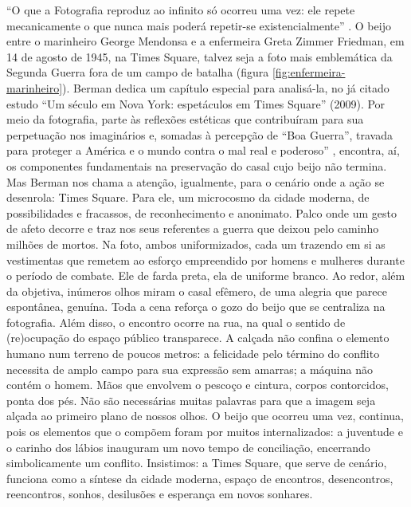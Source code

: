 \begin{refsection}
    ``O que a Fotografia reproduz ao infinito só ocorreu uma vez: ele repete mecanicamente o que nunca mais poderá repetir-se existencialmente'' \cite[p.~14]{Barthes2015Camera}. O beijo entre o marinheiro George Mendonsa e a enfermeira Greta Zimmer Friedman, em 14 de agosto de 1945, na Times Square, talvez seja a foto mais emblemática da Segunda Guerra fora de um campo de batalha (figura \ref{fig:enfermeira-marinheiro}). Berman dedica um capítulo especial para analisá-la, no já citado estudo ``Um século em Nova York: espetáculos em Times Square'' (2009). Por meio da fotografia, parte às reflexões estéticas que contribuíram para sua perpetuação nos imaginários e, somadas à percepção de ``Boa Guerra'', travada para proteger a América e o mundo contra o mal real e poderoso'' \cite[p.~92]{Berman2009Seculo}, encontra, aí, os componentes fundamentais na preservação do casal cujo beijo não termina. Mas Berman nos chama a atenção, igualmente, para o cenário onde a ação se desenrola: Times Square. Para ele, um microcosmo da cidade moderna, de possibilidades e fracassos, de reconhecimento e anonimato. Palco onde um gesto de afeto decorre e traz nos seus referentes a guerra que deixou pelo caminho milhões de mortos. Na foto, ambos uniformizados, cada um trazendo em si as vestimentas que remetem ao esforço empreendido por homens e mulheres durante o período de combate. Ele de farda preta, ela de uniforme branco. Ao redor, além da objetiva, inúmeros olhos miram o casal efêmero, de uma alegria que parece espontânea, genuína. Toda a cena reforça o gozo do beijo que se centraliza na fotografia. Além disso, o encontro ocorre na rua, na qual o sentido de (re)ocupação do espaço público transparece. A calçada não confina o elemento humano num terreno de poucos metros: a felicidade pelo término do conflito necessita de amplo campo para sua expressão sem amarras; a máquina não contém o homem. Mãos que envolvem o pescoço e cintura, corpos contorcidos, ponta dos pés. Não são necessárias muitas palavras para que a imagem seja alçada ao primeiro plano de nossos olhos. O beijo que ocorreu uma vez, continua, pois os elementos que o compõem foram por muitos internalizados: a juventude e o carinho dos lábios inauguram um novo tempo de conciliação, encerrando simbolicamente um conflito. Insistimos: a Times Square, que serve de cenário, funciona como a síntese da cidade moderna, espaço de encontros, desencontros, reencontros, sonhos, desilusões e esperança em novos sonhares. 


\end{refsection}
